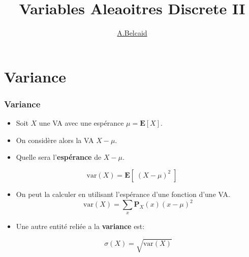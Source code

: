 \documentclass{beamer}
\title{Variables Aleaoitres Discrete II}
\author{\underline{A.Belcaid}}
\institute{\small ENSA-Safi}
\renewcommand{\P}{\mathbf{P}}
\newcommand{\E}{\mathbf{E}}
\newcommand{\var}{\text{var}}
\begin{document}
\maketitle
\begin{frame}
\tableofcontents
\end{frame}
\section{Variance}
\begin{frame}[<+->]
  \frametitle{Variance}
  \begin{itemize}
    \scriptsize
    \item Soit $X$ une \acf{VA} avec une espérance $\mu = \E[X]$.\\[4pt]
    \item On considère alors la \ac{VA}  $X - \mu$.\\[4pt]
    \item Quelle sera l'\alert{\textbf{espérance}}  de $X - \mu$.\\[4pt]
  \end{itemize}
  \pause
  \begin{tcolorbox}[title=Variance]
   \small
   $$
   \var(X) = \E[\;\left(X - \mu\right)^2\;]
   $$
 \end{tcolorbox}

\begin{itemize}
  \scriptsize
  \item On peut la calculer en utilisant l'espérance d'une fonction d'une
    \ac{VA}.
    \small
    \begin{equation*}
      \var(X) = \sum_x \P_X(x) \left(x - \mu\right)^2
    \end{equation*}
  \item Une autre entité reliée a la \textbf{variance} est:
    \begin{tcolorbox}[title=Ecart type]
      $$
      \sigma(X) = \sqrt{\var\left(X\right)} $$
    \end{tcolorbox}
    
\end{itemize}
\end{frame}
\end{document}
